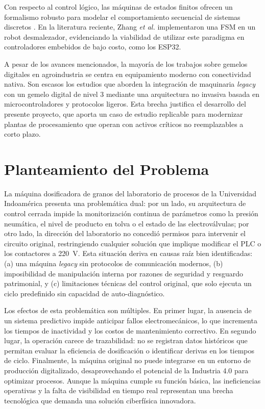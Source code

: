 Con respecto al control lógico, las máquinas de estados finitos ofrecen un formalismo robusto para modelar el comportamiento secuencial de sistemas discretos \cite{cassandras2008introduction}. En la literatura reciente, Zhang \textit{et al.} \cite{zhang2019fsmweeding} implementaron una FSM en un robot desmalezador, evidenciando la viabilidad de utilizar este paradigma en controladores embebidos de bajo costo, como los ESP32.

A pesar de los avances mencionados, la mayoría de los trabajos sobre gemelos digitales en agroindustria se centra en equipamiento moderno con conectividad nativa. Son escasos los estudios que aborden la integración de maquinaria \textit{legacy} con un gemelo digital de nivel 3 mediante una arquitectura no invasiva basada en microcontroladores y protocolos ligeros. Esta brecha justifica el desarrollo del presente proyecto, que aporta un caso de estudio replicable para modernizar plantas de procesamiento que operan con activos críticos no reemplazables a corto plazo.

\section{Planteamiento del Problema}
La máquina dosificadora de granos del laboratorio de procesos de la Universidad Indoamérica presenta una problemática dual: por un lado, su arquitectura de control cerrada impide la monitorización continua de parámetros como la presión neumática, el nivel de producto en tolva o el estado de las electroválvulas; por otro lado, la dirección del laboratorio no concedió permisos para intervenir el circuito original, restringiendo cualquier solución que implique modificar el PLC o los contactores a 220~V. Esta situación deriva en causas raíz bien identificadas: (a) una máquina \textit{legacy} sin protocolos de comunicación modernos, (b) imposibilidad de manipulación interna por razones de seguridad y resguardo patrimonial, y (c) limitaciones técnicas del control original, que solo ejecuta un ciclo predefinido sin capacidad de auto-diagnóstico.

Los efectos de esta problemática son múltiples. En primer lugar, la ausencia de un sistema predictivo impide anticipar fallos electromecánicos, lo que incrementa los tiempos de inactividad y los costos de mantenimiento correctivo. En segundo lugar, la operación carece de trazabilidad: no se registran datos históricos que permitan evaluar la eficiencia de dosificación o identificar derivas en los tiempos de ciclo. Finalmente, la máquina original no puede integrarse en un entorno de producción digitalizado, desaprovechando el potencial de la Industria 4.0 para optimizar procesos. Aunque la máquina cumple su función básica, las ineficiencias operativas y la falta de visibilidad en tiempo real representan una brecha tecnológica que demanda una solución ciberfísica innovadora.

